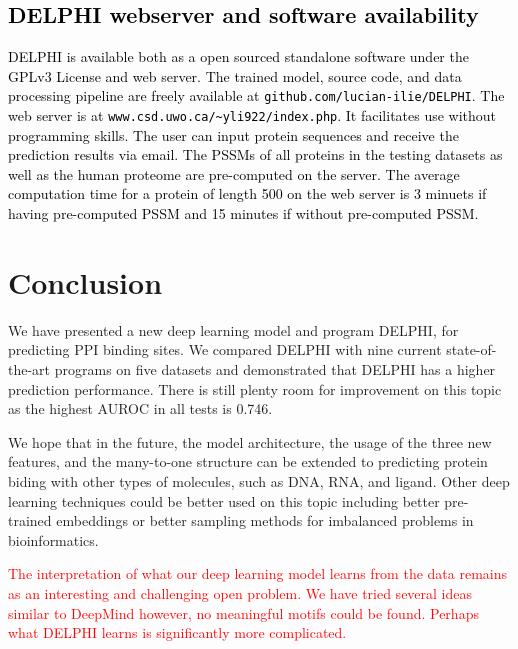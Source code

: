 \documentclass{bioinfo}
\newcommand{\mySecondColor}{black}
\newcommand{\mythirdColor}{red}
\begin{document}
\subsection{\textcolor{\mySecondColor}{DELPHI webserver and software availability}}
\textcolor{\mySecondColor}{DELPHI is available both as a open sourced standalone software under the GPLv3 License and web server. The trained model, source code, and data processing pipeline are freely available at \texttt{github.com/lucian-ilie/DELPHI}. The web server is at  \texttt{www.csd.uwo.ca/\textasciitilde{}yli922/index.php}.
It facilitates use without programming skills. The user can input protein sequences and receive the prediction results via email. The PSSMs of all proteins in the testing datasets as well as the human proteome are pre-computed on the server. The average computation time for a protein of length 500 on the web server is 3 minuets if having pre-computed PSSM and 15 minutes if without pre-computed PSSM.
}


\section{Conclusion}
We have presented a new deep learning model and program DELPHI, for predicting PPI binding sites. We compared DELPHI with nine current state-of-the-art programs on five datasets and demonstrated that DELPHI has a higher prediction performance. There is still plenty room for improvement on this topic as the highest AUROC in all tests is 0.746. 

We hope that in the future, the model architecture, the usage of the three new features, and the many-to-one structure can be extended to predicting protein biding with other types of molecules, such as DNA, RNA, and ligand. Other deep learning techniques could be better used on this topic including better pre-trained embeddings or better sampling methods for imbalanced problems in bioinformatics. 

\textcolor{\mythirdColor}{The interpretation of what our deep learning model learns from the data remains as an interesting and challenging open problem. We have tried several ideas similar to DeepMind \citep{alipanahi2015predicting} however, no meaningful motifs could be found. Perhaps what DELPHI learns is significantly more complicated.}

\end{document}
